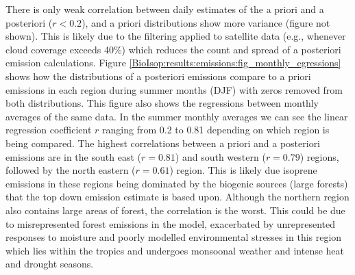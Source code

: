    
    
    
    
    There is only weak correlation between daily estimates of the a priori and a posteriori ($r < 0.2$), and a priori distributions show more variance (figure not shown).
    This is likely due to the filtering applied to satellite data (e.g., whenever cloud coverage exceeds 40\%) which reduces the count and spread of a posteriori emission calculations.
    Figure \ref{BioIsop:results:emissions:fig_monthly_egressions} shows how the distributions of a posteriori emissions compare to a priori emissions in each region during summer months (DJF) with zeros removed from both distributions. %
    This figure also shows the regressions between monthly averages of the same data. 
    In the summer monthly averages we can see the linear regression coefficient $r$ ranging from 0.2 to 0.81 depending on which region is being compared.
    The highest correlations between a priori and a posteriori emissions are in the south east ($r=0.81$) and south western ($r=0.79$) regions, followed by the north eastern ($r=0.61$) region.
    This is likely due isoprene emissions in these regions being dominated by the biogenic sources (large forests) that the top down emission estimate is based upon.
    Although the northern region also contains large areas of forest, the correlation is the worst.
    This could be due to misrepresented forest emissions in the model, exacerbated by unrepresented responses to moisture and poorly modelled environmental stresses in this region which lies within the tropics and undergoes monsoonal weather and intense heat and drought seasons.
    
